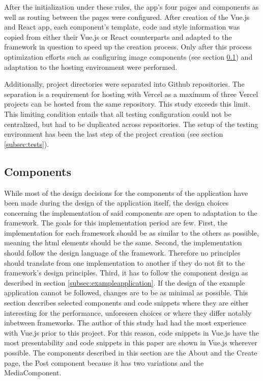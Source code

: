 \documentclass[a4paper, 10pt]{article}
\begin{document}
After the initialization under these rules, the app's four pages and components as well as routing between the pages were configured.
After creation of the Vue.js and React app, each component's template, code and style information was copied from either their Vue.js or React counterparts and adapted to the framework in question to speed up the creation process.
Only after this process optimization efforts such as configuring image components (see section \ref{subsec:components}) and adaptation to the hosting environment were performed.

Additionally, project directories were separated into Github repositories.
The separation is a requirement for hosting with Vercel as a maximum of three Vercel projects can be hosted from the same repository.
This study exceeds this limit.
This limiting condition entails that all testing configuration could not be centralized, but had to be duplicated across repositories.
The setup of the testing environment has been the last step of the project creation (see section \ref{subsec:tests}).

\subsection{Components}\label{subsec:components}
% 

While most of the design decisions for the components of the application have been made during the design of the application itself, the design choices concerning the implementation of said components are open to adaptation to the framework.
The goals for this implementation period are few.
First, the implementation for each framework should be as similar to the others as possible, meaning the \acrshort{html} elements should be the same.
Second, the implementation should follow the design language of the framework.
Therefore no principles should translate from one implementation to another if they do not fit to the framework's design principles.
Third, it has to follow the component design as described in section \ref{subsec:exampleapplication}.
If the design of the example application cannot be followed, changes are to be as minimal as possible.
This section describes selected components and code snippets where they are either interesting for the performance, unforeseen choices or where they differ notably inbetween frameworks.
The author of this study had had the most experience with Vue.js prior to this project.
For this reason, code snippets in Vue.js have the most presentability and code snippets in this paper are shown in Vue.js wherever possible.
The components described in this section are the About and the Create page, the Post component because it has two variations and the MediaComponent.
\end{document}
